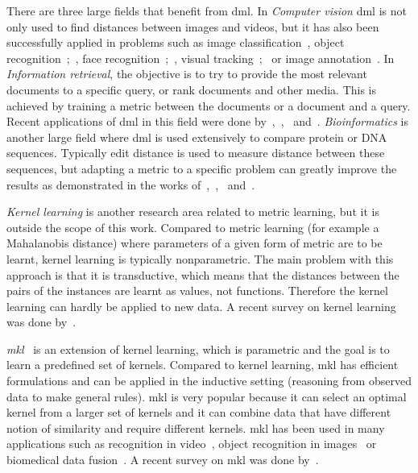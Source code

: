 \documentclass[12pt,a4paper]{report}
\begin{document}
There are three large fields that benefit from \ac{dml}. In \textit{Computer vision} \ac{dml} is not only used to find distances between images and videos, but it has also been successfully applied in problems such as image classification~\citep{mensink2012metric}, object recognition~\citep{frome2007learning};~\citep{verma2012learning}, face recognition~\citep{guillaumin2009you};~\citep{lu2014neighborhood}, visual tracking~\citep{li2012non};~\citep{jiang2012order} or image annotation~\citep{guillaumin2009tagprop}. In \textit{Information retrieval}, the objective is to try to provide the most relevant documents to a specific query, or rank documents and other media. This is achieved by training a metric between the documents or a document and a query. Recent applications of \ac{dml} in this field were done by~\citep{lebanon2006metric},~\citep{lee2008rank},~\citep{mcfee2010metric} and~\citep{lim2013robust}. \textit{Bioinformatics} is another large field where \ac{dml} is used extensively to compare protein or DNA sequences. Typically edit distance is used to measure distance between these sequences, but adapting a metric to a specific problem can greatly improve the results as demonstrated in the works of~\citep{xiong2006kernel},~\citep{saigo2006optimizing},~\citep{kato2010metric} and~\citep{wang2012prodis}.

\textit{Kernel learning} is another research area related to metric learning, but it is outside the scope of this work. Compared to metric learning (for example a Mahalanobis distance) where parameters of a given form of metric are to be learnt, kernel learning is typically nonparametric. The main problem with this approach is that it is transductive, which means that the distances between the pairs of the instances are learnt as values, not functions. Therefore the kernel learning can hardly be applied to new data. A recent survey on kernel learning was done by~\citep{abbasnejad2012survey}.

\textit{\Ac{mkl}}~\citep{gonen2011multiple} is an extension of kernel learning, which is parametric and the goal is to learn a predefined set of kernels. Compared to kernel learning, \ac{mkl} has efficient formulations and can be applied in the inductive setting (reasoning from observed data to make general rules). \Ac{mkl} is very popular because it can select an optimal kernel from a larger set of kernels and it can combine data that have different notion of similarity and require different kernels. \ac{mkl} has been used in many applications such as recognition in video~\citep{chen2013event}, object recognition in images~\citep{bucak2014multiple} or biomedical data fusion~\citep{yu20102}. A recent survey on \ac{mkl} was done by~\citep{gonen2011multiple}.
\end{document}
